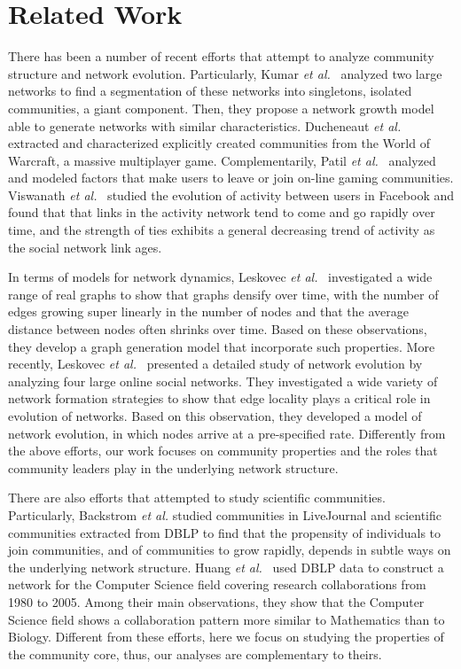\section{Related Work}


There has been a number of recent efforts that attempt to analyze community structure and network evolution.  Particularly, Kumar \textit{et al.}~\cite{Kumar:2006} analyzed two large networks to
find a segmentation of these networks into singletons, isolated communities, a giant component. Then, they propose a network growth model able to generate networks with similar
characteristics.  Ducheneaut \textit{et al.}~\cite{Ducheneaut:2007} extracted and characterized explicitly created communities from the World of Warcraft, a massive multiplayer game.
Complementarily, Patil \textit{et al.}~\cite{Patil:2012} analyzed and modeled factors that make users to leave or join on-line gaming communities.  Viswanath \textit{et
al.}~\cite{Viswanath:2009} studied the evolution of activity between users in Facebook and found that that links in the activity network tend to come and go rapidly over time, and
the strength of ties exhibits a general decreasing trend of activity as the social network link ages.

In terms of models for network dynamics, Leskovec \textit{et al.}~\cite{Leskovec:2005} investigated a wide range of real graphs to show that graphs densify over time, with the
number of edges growing super linearly in the number of nodes and that the average distance between nodes often shrinks over time. Based on these observations, they develop a graph
generation model that incorporate such properties.  More recently, Leskovec \textit{et al.}~\cite{Leskovec:2008} presented a detailed study of network evolution by analyzing four
large online social networks.  They investigated a wide variety of network formation strategies to show that edge locality plays a critical role in evolution of networks.  Based on
this observation, they developed a model of network evolution, in which nodes arrive at a pre-specified rate.  Differently from the above efforts, our work focuses on community
properties and the roles that community leaders play in the underlying network structure.

There are also efforts that attempted to study scientific communities. Particularly, Backstrom \textit{et al.}\cite{Backstrom:2006} studied communities in LiveJournal and
scientific communities extracted from DBLP to find that the propensity of individuals to join communities, and of communities to grow rapidly, depends in subtle ways on the
underlying network structure. Huang \textit{et al.}~\cite{Huang:2008} used DBLP data to construct a network for the Computer Science field covering research collaborations from
1980 to 2005.  Among their main observations, they show that the Computer Science field shows a collaboration pattern more similar to Mathematics than to Biology.  
Different from these efforts, here we focus on studying the properties of the community core, thus, our analyses are complementary to
theirs.

